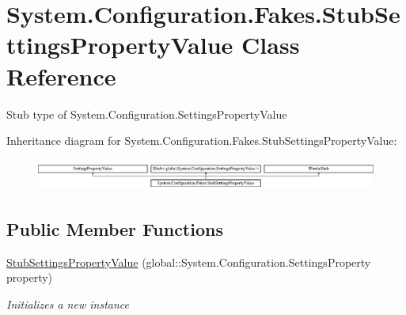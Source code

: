 \hypertarget{class_system_1_1_configuration_1_1_fakes_1_1_stub_settings_property_value}{\section{System.\-Configuration.\-Fakes.\-Stub\-Settings\-Property\-Value Class Reference}
\label{class_system_1_1_configuration_1_1_fakes_1_1_stub_settings_property_value}
}


Stub type of System.\-Configuration.\-Settings\-Property\-Value 


Inheritance diagram for System.\-Configuration.\-Fakes.\-Stub\-Settings\-Property\-Value\-:\begin{figure}[H]
\begin{center}
\leavevmode
\includegraphics[height=1.037037cm]{class_system_1_1_configuration_1_1_fakes_1_1_stub_settings_property_value}
\end{center}
\end{figure}
\subsection*{Public Member Functions}
\begin{DoxyCompactItemize}
\item 
\hyperlink{class_system_1_1_configuration_1_1_fakes_1_1_stub_settings_property_value_a9c8fed88038c9ed4a68396cbe1348a7c}{Stub\-Settings\-Property\-Value} (global\-::\-System.\-Configuration.\-Settings\-Property property)
\begin{DoxyCompactList}\small\item\em Initializes a new instance\end{DoxyCompactList}\end{DoxyCompactItemize}
